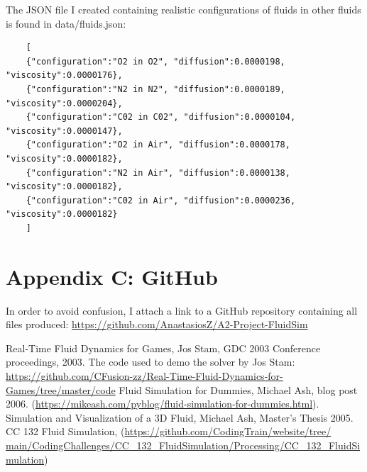\documentclass[12pt,a4paper]{book}
\begin{document}
The JSON file I created containing realistic configurations of fluids in other fluids is found in data/fluids.json:
\begin{verbatim}
	[
	{"configuration":"O2 in O2", "diffusion":0.0000198, "viscosity":0.0000176},
	{"configuration":"N2 in N2", "diffusion":0.0000189, "viscosity":0.0000204},
	{"configuration":"C02 in C02", "diffusion":0.0000104, "viscosity":0.0000147},
	{"configuration":"O2 in Air", "diffusion":0.0000178, "viscosity":0.0000182},
	{"configuration":"N2 in Air", "diffusion":0.0000138, "viscosity":0.0000182},
	{"configuration":"C02 in Air", "diffusion":0.0000236, "viscosity":0.0000182}    
	]
\end{verbatim}


\section{Appendix C: GitHub}
In order to avoid confusion, I attach a link to a GitHub repository containing all files produced: \href{https://github.com/AnastasiosZ/A2-Project-FluidSim}{https://github.com/AnastasiosZ/A2-Project-FluidSim}


\begin{thebibliography}{9}
	 Real-Time Fluid Dynamics for Games, Jos Stam, GDC 2003 Conference proceedings, 2003.
	 The code used to demo the solver by Jos Stam: \href{https://github.com/CFusion-zz/Real-Time-Fluid-Dynamics-for-Games/tree/master/code}{https://github.com/CFusion-zz/Real-Time-Fluid-Dynamics-for-Games/tree/master/code}
	 Fluid Simulation for Dummies, Michael Ash, blog post 2006. (\href{https://mikeash.com/pyblog/fluid-simulation-for-dummies.html}{https://mikeash.com/pyblog/fluid-simulation-for-dummies.html}).
	 Simulation and Visualization of a 3D Fluid, Michael Ash, Master's Thesis 2005.
	 CC 132 Fluid Simulation, (\href{https://github.com/CodingTrain/website/tree/main/CodingChallenges/CC_132_FluidSimulation/Processing/CC_132_FluidSimulation}{https://github.com/CodingTrain/website/tree/\\main/CodingChallenges/CC\_132\_FluidSimulation/Processing/CC\_132\_FluidSimulation})
\end{thebibliography}
\end{document}
